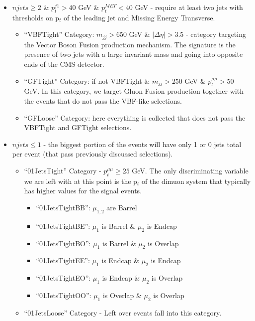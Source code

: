 \begin{itemize}
  \item $njets \ge 2$ \& $p_{t}^{j1} > 40$ GeV \& $p_{t}^{MET} < 40$ GeV - require at least two jets with thresholds on p$_t$ of the leading jet and Missing Energy Transverse.
    \begin{itemize}
      \item ``VBFTight'' Category: $m_{jj} > 650$ GeV \& $|\Delta \eta| > 3.5$ - category targeting the Vector Boson Fusion production mechanism. The signature is the presence of two jets with a large invariant mass and going into opposite ends of the CMS detector.
      \item ``GFTight'' Category: if not VBFTight \& $m_{jj} > 250$ GeV \& $p_{t}^{\mu\mu} > 50$ GeV. In this category, we target Gluon Fusion production together with the events that do not pass the VBF-like selections.
      \item ``GFLoose'' Category: here everything is collected that does not pass the VBFTight and GFTight selections.
    \end{itemize}
  \item $njets \le 1$ - the biggest portion of the events will have only 1 or 0 jets total per event (that pass previously discussed selections).
    \begin{itemize}
      \item ``01JetsTight'' Category - $p_t^{\mu\mu} \ge 25$ GeV. The only discriminating variable we are left with at this point is the p$_t$ of the dimuon system that typically has higher values for the signal events.
        \begin{itemize}
          \item ``01JetsTightBB'': $\mu_{1,2}$ are Barrel
          \item ``01JetsTightBE'': $\mu_{1}$ is Barrel \& $\mu_2$ is Endcap
          \item ``01JetsTightBO'': $\mu_{1}$ is Barrel \& $\mu_2$ is Overlap
          \item ``01JetsTightEE'': $\mu_{1}$ is Endcap \& $\mu_2$ is Endcap
          \item ``01JetsTightEO'': $\mu_{1}$ is Endcap \& $\mu_2$ is Overlap
          \item ``01JetsTightOO'': $\mu_{1}$ is Overlap \& $\mu_2$ is Overlap
        \end{itemize}
      \item ``01JetsLoose'' Category - Left over events fall into this category.
        \begin{itemize}

\end{itemize}
\end{itemize}
\end{itemize}
